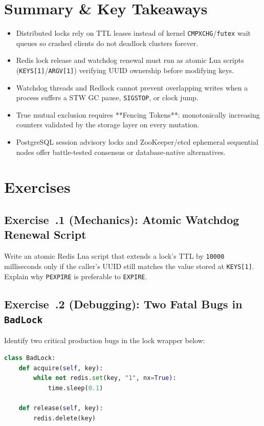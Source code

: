 \section{Summary \protect\& Key Takeaways}
\begin{itemize}[leftmargin=18pt]
  \item Distributed locks rely on TTL leases instead of kernel \texttt{CMPXCHG}/\texttt{futex} wait queues so crashed clients do not deadlock clusters forever.
  \item Redis lock release and watchdog renewal must run as atomic Lua scripts (\texttt{KEYS[1]}/\texttt{ARGV[1]}) verifying UUID ownership before modifying keys.
  \item Watchdog threads and Redlock cannot prevent overlapping writes when a process suffers a STW GC pause, \texttt{SIGSTOP}, or clock jump.
  \item True mutual exclusion requires **Fencing Tokens**: monotonically increasing counters validated by the storage layer on every mutation.
  \item PostgreSQL session advisory locks and ZooKeeper/etcd ephemeral sequential nodes offer battle-tested consensus or database-native alternatives.
\end{itemize}

\section{Exercises}

\subsection*{Exercise~\thechapter.1 (Mechanics): Atomic Watchdog Renewal Script}
Write an atomic Redis Lua script that extends a lock's TTL by \texttt{10000} milliseconds only if the caller's UUID still matches the value stored at \texttt{KEYS[1]}. Explain why \texttt{PEXPIRE} is preferable to \texttt{EXPIRE}.

\subsection*{Exercise~\thechapter.2 (Debugging): Two Fatal Bugs in \texttt{BadLock}}
Identify two critical production bugs in the lock wrapper below:
\begin{lstlisting}[language=Python]
class BadLock:
    def acquire(self, key):
        while not redis.set(key, "1", nx=True):
            time.sleep(0.1)

    def release(self, key):
        redis.delete(key)
\end{lstlisting}

